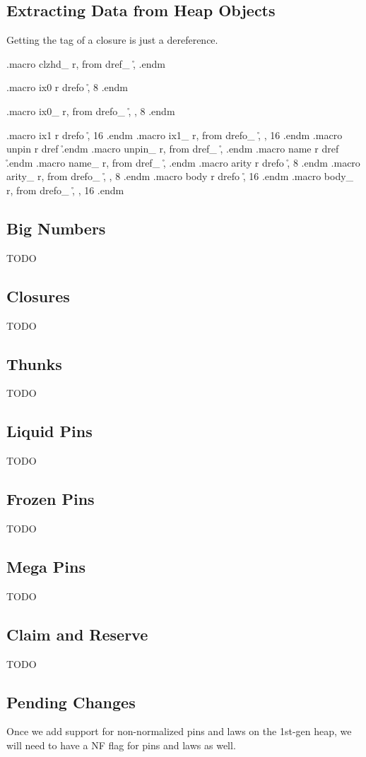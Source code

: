 \subsection{Extracting Data from Heap Objects}

Getting the tag of a closure is just a dereference.

\begin{asm}
.macro clzhd_ r, from
	dref_	\r, \from
.endm

.macro ix0 r
	drefo	\r, 8
.endm

.macro ix0_ r, from
	drefo_	\r, \from, 8
.endm

.macro ix1 r
	drefo	\r, 16
.endm
.macro ix1_ r, from
	drefo_	\r, \from, 16
.endm
.macro unpin r
	dref	\r
.endm
.macro unpin_ r, from
	dref_	\r, \from
.endm
.macro name r
	dref	\r
.endm
.macro name_ r, from
	dref_	\r, \from
.endm
.macro arity r
	drefo	\r, 8
.endm
.macro arity_ r, from
	drefo_	\r, \from, 8
.endm
.macro body r
	drefo	\r, 16
.endm
.macro body_ r, from
	drefo_	\r, \from, 16
.endm
\end{asm}

\subsection{Big Numbers}
TODO
\subsection{Closures}
TODO
\subsection{Thunks}
TODO
\subsection{Liquid Pins}
TODO
\subsection{Frozen Pins}
TODO
\subsection{Mega Pins}
TODO
\subsection{Claim and Reserve}
TODO
\subsection{Pending Changes}
Once we add support for non-normalized pins and laws on the 1st-gen heap,
we will need to have a NF flag for pins and laws as well.

